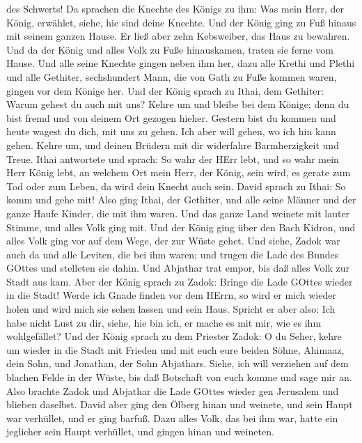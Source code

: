 des Schwerts!  Da sprachen die Knechte des Königs zu ihm:
Was mein Herr, der König, erwählet, siehe, hie sind deine Knechte.
 Und der König ging zu Fuß hinaus mit seinem ganzen Hause.
Er ließ aber zehn Kebsweiber, das Haus zu bewahren.  Und da
der König und alles Volk zu Fuße hinauskamen, traten sie ferne vom
Hause.  Und alle seine Knechte gingen neben ihm her, dazu
alle Krethi und Plethi und alle Gethiter, sechshundert Mann, die von
Gath zu Fuße kommen waren, gingen vor dem Könige her.  Und
der König sprach zu Ithai, dem Gethiter: Warum gehest du auch mit uns?
Kehre um und bleibe bei dem Könige; denn du bist fremd und von deinem
Ort gezogen hieher.  Gestern bist du kommen und heute
wagest du dich, mit uns zu gehen. Ich aber will gehen, wo ich hin kann
gehen. Kehre um, und deinen Brüdern mit dir widerfahre Barmherzigkeit
und Treue.  Ithai antwortete und sprach: So wahr der HErr
lebt, und so wahr mein Herr König lebt, an welchem Ort mein Herr, der
König, sein wird, es gerate zum Tod oder zum Leben, da wird dein Knecht
auch sein.  David sprach zu Ithai: So komm und gehe mit!
Also ging Ithai, der Gethiter, und alle seine Männer und der ganze Haufe
Kinder, die mit ihm waren.  Und das ganze Land weinete mit
lauter Stimme, und alles Volk ging mit. Und der König ging über den Bach
Kidron, und alles Volk ging vor auf dem Wege, der zur Wüste gehet.
 Und siehe, Zadok war auch da und alle Leviten, die bei ihm
waren; und trugen die Lade des Bundes GOttes und stelleten sie dahin.
Und Abjathar trat empor, bis daß alles Volk zur Stadt aus kam.
 Aber der König sprach zu Zadok: Bringe die Lade GOttes
wieder in die Stadt! Werde ich Gnade finden vor dem HErrn, so wird er
mich wieder holen und wird mich sie sehen lassen und sein Haus.
 Spricht er aber also: Ich habe nicht Lust zu dir, siehe,
hie bin ich, er mache es mit mir, wie es ihm wohlgefället? 
Und der König sprach zu dem Priester Zadok: O du Seher, kehre um wieder
in die Stadt mit Frieden und mit euch eure beiden Söhne, Ahimaaz, dein
Sohn, und Jonathan, der Sohn Abjathars.  Siehe, ich will
verziehen auf dem blachen Felde in der Wüste, bis daß Botschaft von euch
komme und sage mir an.  Also brachte Zadok und Abjathar die
Lade GOttes wieder gen Jerusalem und blieben daselbst. 
David aber ging den Ölberg hinan und weinete, und sein Haupt war
verhüllet, und er ging barfuß. Dazu alles Volk, das bei ihm war, hatte
ein jeglicher sein Haupt verhüllet, und gingen hinan und weineten.
